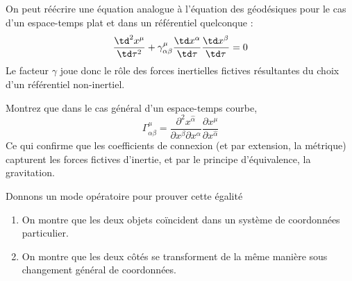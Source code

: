On peut réécrire une équation analogue à l'équation des géodésiques pour le cas d'un espace-temps plat et dans un référentiel quelconque :
\begin{equation}
    \frac{\td ^2x^{\mu}}{\td \tau^2} + \gamma^\mu_{\alpha\beta} \frac{\td x^{\alpha}}{\td \tau}\frac{\td x^{\beta}}{\td \tau}=0
\end{equation}
Le facteur $\gamma$ joue donc le rôle des forces inertielles fictives résultantes du choix d'un référentiel non-inertiel. 
\begin{exerc}
    Montrez que dans le cas général d'un espace-temps courbe, 
    \begin{equation}
        \boxed{\Gamma^{\mu}_{\alpha \beta} = \frac{\partial^2 x^{\hat{\alpha}}}{\partial x^{\beta}\partial x^{\alpha}}\frac{\partial x^{\mu}}{\partial x^{\hat{\alpha}}} }
        \label{eq: Coefficients en dérivées}
    \end{equation}
    Ce qui confirme que les coefficients de connexion (et par extension, la métrique) capturent les forces fictives d'inertie, et par le principe d'équivalence, la gravitation.
\end{exerc}
Donnons un mode opératoire pour prouver cette égalité
\begin{enumerate}
    \item On montre que les deux objets coïncident dans un système de coordonnées particulier. 
    \item On montre que les deux côtés se transforment de la même manière sous changement général de coordonnées.
\end{enumerate}
